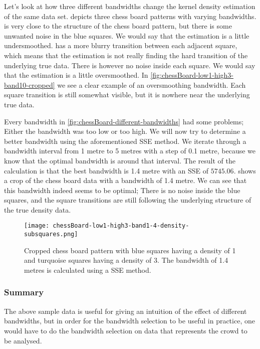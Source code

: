 Let's look at how three different bandwidths change the kernel density estimation of the same data set.  depicts three chess board patterns with varying bandwidths.  is very close to the structure of the chess board pattern, but there is some unwanted noise in the blue squares. We would say that the estimation is a little undersmoothed.  has a more blurry transition between each adjacent square, which means that the estimation is not really finding the hard transition of the underlying true data. There is however no noise inside each square. We would say that the estimation is a little oversmoothed. In \cref{fig:chessBoard-low1-high3-band10-cropped} we see a clear example of an oversmoothing bandwidth. Each square transition is still somewhat visible, but it is nowhere near the underlying true data.

Every bandwidth in \cref{fig:chessBoard-different-bandwidths} had some problems; Either the bandwidth was too low or too high. We will now try to determine a better bandwidth using the aforementioned SSE method. We iterate through a bandwidth interval from 1 metre to 5 metres with a step of 0.1 metre, because we know that the optimal bandwidth is around that interval. The result of the calculation is that the best bandwidth is 1.4 metre with an SSE of $5745.06$.  shows a crop of the chess board data with a bandwidth of 1.4 metre. We can see that this bandwidth indeed seems to be optimal; There is no noise inside the blue squares, and the square transitions are still following the underlying structure of the true density data.

\begin{figure}[htbp]
\centering
\texttt{[image: chessBoard-low1-high3-band1-4-density-subsquares.png]}
\caption{Cropped chess board pattern with blue squares having a density of 1 and turquoise squares having a density of 3. The bandwidth of 1.4 metres is calculated using a SSE method.}
\label{fig:chessBoard-low1-high3-band1.4-cropped}
\end{figure}

\subsubsection{Summary}

The above sample data is useful for giving an intuition of the effect of different bandwidths, but in order for the bandwidth selection to be useful in practice, one would have to do the bandwidth selection on data that represents the crowd to be analysed.